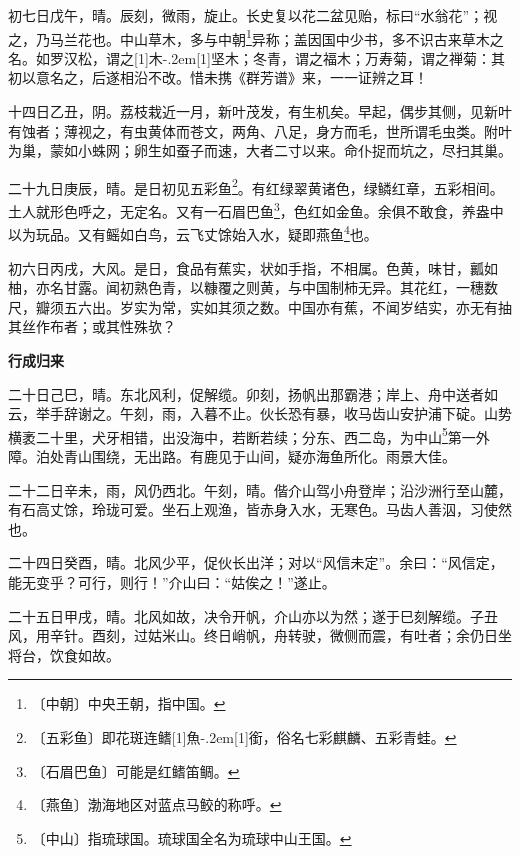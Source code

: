 \documentclass[12pt,UTF-8,openany]{ctexbook}
\begin{document}
\begin{normalsize}
    初七日戊午，晴。辰刻，微雨，旋止。长史复以花二盆见贻，标曰“水翁花”；视之，乃马兰花也。中山草木，多与中朝\footnote{〔中朝〕中央王朝，指中国。}异称；盖因国中少书，多不识古来草木之名。如罗汉松，谓之\hbox{\scalebox{0.4}[1]{木}\kern-.2em\scalebox{0.75}[1]{坚}}木；冬青，谓之福木；万寿菊，谓之禅菊：其初以意名之，后遂相沿不改。惜未携《群芳谱》来，一一证辨之耳！
    
    十四日乙丑，阴。荔枝栽近一月，新叶茂发，有生机矣。早起，偶步其侧，见新叶有蚀者；薄视之，有虫黄体而苍文，两角、八足，身方而毛，世所谓毛虫类。附叶为巢，蒙如小蛛网；卵生如蚕子而速，大者二寸以来。命仆捉而坑之，尽扫其巢。
    
    二十九日庚辰，晴。是日初见五彩鱼\footnote{〔五彩鱼〕即花斑连鳍\hbox{\scalebox{0.4}[1]{魚}\kern-.2em\scalebox{0.75}[1]{銜}}，俗名七彩麒麟、五彩青蛙。}。有红绿翠黄诸色，绿鳞红章，五彩相间。土人就形色呼之，无定名。又有一石眉巴鱼\footnote{〔石眉巴鱼〕可能是红鳍笛鲷。}，色红如金鱼。余俱不敢食，养盎中以为玩品。又有鳐如白鸟，云飞丈馀始入水，疑即燕鱼\footnote{〔燕鱼〕渤海地区对蓝点马鲛的称呼。}也。
    
    初六日丙戌，大风。是日，食品有蕉实，状如手指，不相属。色黄，味甘，瓤如柚，亦名甘露。闻初熟色青，以糠覆之则黄，与中国制柿无异。其花红，一穗数尺，瓣须五六出。岁实为常，实如其须之数。中国亦有蕉，不闻岁结实，亦无有抽其丝作布者；或其性殊欤？
    
    \begin{center}
        \textbf{行成归来}
    \end{center}
    
    二十日己巳，晴。东北风利，促解缆。卯刻，扬帆出那霸港；岸上、舟中送者如云，举手辞谢之。午刻，雨，入暮不止。伙长恐有暴，收马齿山安护浦下碇。山势横袤二十里，犬牙相错，出没海中，若断若续；分东、西二岛，为中山\footnote{〔中山〕指琉球国。琉球国全名为琉球中山王国。}第一外障。泊处青山围绕，无出路。有鹿见于山间，疑亦海鱼所化。雨景大佳。
    
    二十二日辛未，雨，风仍西北。午刻，晴。偕介山驾小舟登岸；沿沙洲行至山麓，有石高丈馀，玲珑可爱。坐石上观渔，皆赤身入水，无寒色。马齿人善泅，习使然也。
    
    二十四日癸酉，晴。北风少平，促伙长出洋；对以“风信未定”。余曰：“风信定，能无变乎？可行，则行！”介山曰：“姑俟之！”遂止。
    
    二十五日甲戌，晴。北风如故，决令开帆，介山亦以为然；遂于巳刻解缆。子丑风，用辛针。酉刻，过姑米山。终日峭帆，舟转驶，微侧而震，有吐者；余仍日坐将台，饮食如故。
    

\end{normalsize}
\end{document}
